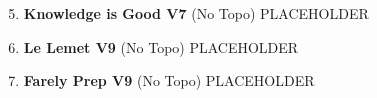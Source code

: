 \begin{multicols*}{2}
				\begin{enumerate}[]
					\setcounter{enumi}{4}
					\item\label{rt:Knowledge is Good} \colorbox{Goldenrod!50}{\textbf{Knowledge is Good V7  } }
						\newline (No Topo) 
					\newline PLACEHOLDER\
					\setcounter{enumi}{5}
					\item\label{rt:Le Lemet} \colorbox{Goldenrod!50}{\textbf{Le Lemet V9  } }
						\newline (No Topo) 
					\newline PLACEHOLDER\
					\setcounter{enumi}{6}
					\item\label{rt:Farely Prep} \colorbox{Goldenrod!50}{\textbf{Farely Prep V9  } }
						\newline (No Topo) 
					\newline PLACEHOLDER\
				\end{enumerate}
\end{multicols*}
\clearpage